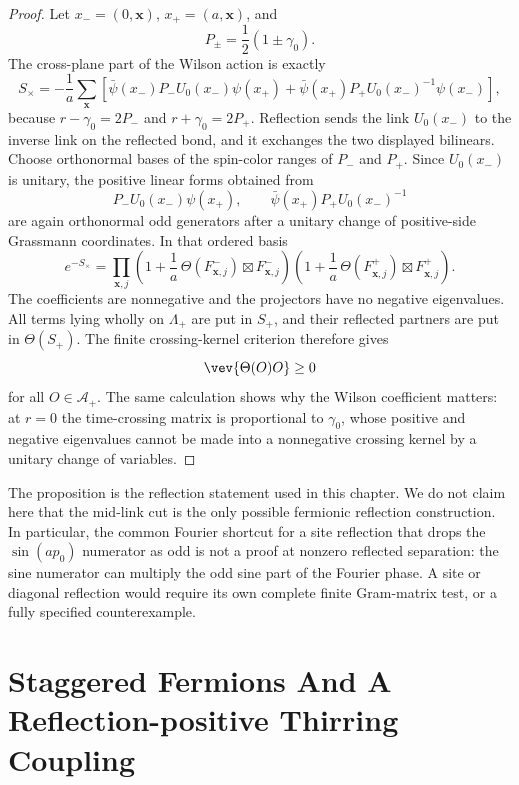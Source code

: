 \begin{proof}
Let \(x_-=(0,\mathbf x)\), \(x_+=(a,\mathbf x)\), and
\[
  P_\pm=\frac12(1\pm\gamma_0).
\]
The cross-plane part of the Wilson action is exactly
\begin{equation}
  S_\times
  =
  -\frac1a\sum_{\mathbf x}
  \left[
    \bar\psi(x_-)P_-U_0(x_-)\psi(x_+)
    +
    \bar\psi(x_+)P_+U_0(x_-)^{-1}\psi(x_-)
  \right],
  \label{eq:wilson-midlink-crossing-action}
\end{equation}
because \(r-\gamma_0=2P_-\) and \(r+\gamma_0=2P_+\).  Reflection sends the
link \(U_0(x_-)\) to the inverse link on the reflected bond, and it exchanges
the two displayed bilinears.  Choose orthonormal bases of the spin-color
ranges of \(P_-\) and \(P_+\).  Since \(U_0(x_-)\) is unitary, the positive
linear forms obtained from
\[
  P_-U_0(x_-)\psi(x_+),
  \qquad
  \bar\psi(x_+)P_+U_0(x_-)^{-1}
\]
are again orthonormal odd generators after a unitary change of positive-side
Grassmann coordinates.  In that ordered basis
\[
  e^{-S_\times}
  =
  \prod_{\mathbf x,j}
  \left(1+\frac1a\,\Theta(F^-_{\mathbf x,j})\boxtimes F^-_{\mathbf x,j}\right)
  \left(1+\frac1a\,\Theta(F^+_{\mathbf x,j})\boxtimes F^+_{\mathbf x,j}\right).
\]
The coefficients are nonnegative and the projectors have no negative
eigenvalues.  All terms lying wholly on \(\Lambda_+\) are put in \(S_+\), and
their reflected partners are put in \(\Theta(S_+)\).  The finite
crossing-kernel criterion therefore gives
\[
  \vev{\Theta(O)O}\geq0
\]
for all \(O\in\mathcal A_+\).  The same calculation shows why the Wilson
coefficient matters: at \(r=0\) the time-crossing matrix is proportional to
\(\gamma_0\), whose positive and negative eigenvalues cannot be made into a
nonnegative crossing kernel by a unitary change of variables.
\end{proof}

The proposition is the reflection statement used in this chapter.  We do not
claim here that the mid-link cut is the only possible fermionic reflection
construction.  In particular, the common Fourier shortcut for a site
reflection that drops the \(\sin(ap_0)\) numerator as odd is not a proof at
nonzero reflected separation: the sine numerator can multiply the odd sine
part of the Fourier phase.  A site or diagonal reflection would require its
own complete finite Gram-matrix test, or a fully specified counterexample.

\section{Staggered Fermions And A Reflection-positive Thirring Coupling}

